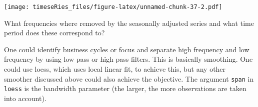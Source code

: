 \documentclass[]{book}
\newenvironment{Shaded}{\begin{snugshade}}{\end{snugshade}}
\newcommand{\DataTypeTok}[1]{\textcolor[rgb]{0.13,0.29,0.53}{#1}}
\newcommand{\DecValTok}[1]{\textcolor[rgb]{0.00,0.00,0.81}{#1}}
\newcommand{\FloatTok}[1]{\textcolor[rgb]{0.00,0.00,0.81}{#1}}
\newcommand{\KeywordTok}[1]{\textcolor[rgb]{0.13,0.29,0.53}{\textbf{#1}}}
\newcommand{\NormalTok}[1]{#1}
\newcommand{\OperatorTok}[1]{\textcolor[rgb]{0.81,0.36,0.00}{\textbf{#1}}}
\newcommand{\StringTok}[1]{\textcolor[rgb]{0.31,0.60,0.02}{#1}}
\begin{document}
\begin{Shaded}
\end{Shaded}

\texttt{[image: timeseRies\_files/figure-latex/unnamed-chunk-37-2.pdf]}

What frequencies where removed by the seasonally adjusted series and
what time period does these correspond to?

One could identify business cycles or focus and separate high frequency
and low frequency by using low pass or high pass filters. This is
basically smoothing. One could use loess, which uses local linear fit,
to achieve this, but any other smoother discussed above could also
achieve the objective. The argument \texttt{span} in \texttt{loess} is
the bandwidth parameter (the larger, the more observations are taken
into account).
\end{document}
